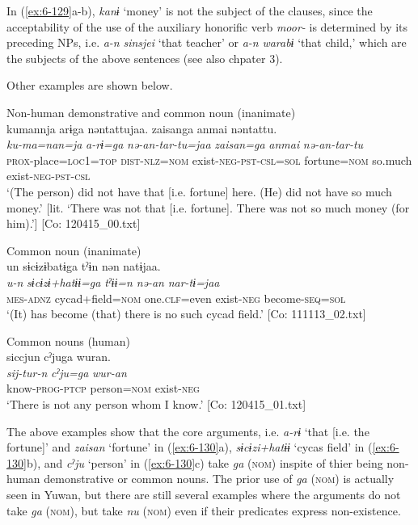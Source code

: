 \begin{styleBeschriftung}
In (\ref{ex:6-129}a-b), \textit{kanɨ} ‘money’ is not the subject of the clauses, since the acceptability of the use of the auxiliary honorific verb \textit{moor-} is determined by its preceding NPs, i.e. \textit{a-n} \textit{sinsjei} ‘that teacher’ or \textit{a-n} \textit{warabɨ} ‘that child,’ which are the subjects of the above sentences (see also chpater 3).

Other examples are shown below.

\ea\label{ex:6-130}
 Non-human demonstrative and common noun (inanimate)\\
 \ea
 {\TM}
 \glll kumannja  arɨga  nəntattujaa.    {\textbar}zaisan{\textbar}ga  anmai  nəntattu.\\
 \textit{ku-ma=nan=ja}  \textit{a-rɨ=ga}  \textit{nə-an-tar-tu=jaa}     \textit{zaisan=ga}  \textit{anmai}  \textit{nə-an-tar-tu}\\
\textsc{prox}-place=\textsc{loc1}=\textsc{top}  \textsc{dist}-\textsc{nlz}=\textsc{nom}  exist-\textsc{neg}-\textsc{pst}-\textsc{csl}=\textsc{sol}   fortune=\textsc{nom}  so.much  exist-\textsc{neg}-\textsc{pst}-\textsc{csl}\\
\glt ‘(The person) did not have that [i.e. fortune] here. (He) did not have so much money.’ [lit. ‘There was not that [i.e. fortune]. There was not so much money (for him).’]       [Co: 120415\_00.txt]
\z

Common noun (inanimate)\\

\ex {\TM}  un  sɨcɨzɨbatɨga  tˀɨn  nən  natɨjaa.\\
\glll \textit{u-n}  \textit{sɨcɨzɨ+hatɨɨ=ga}  \textit{tˀɨɨ=n}  \textit{nə-an}     \textit{nar-tɨ=jaa}\\
\textsc{mes}-\textsc{adnz}  cycad+field=\textsc{nom}  one.\textsc{clf}=even  exist-\textsc{neg}  become-\textsc{seq}=\textsc{sol}\\
\glt ‘(It) has become (that) there is no such cycad field.’ [Co: 111113\_02.txt]
\z

Common nouns (human)\\

\ex {\TM}  siccjun  cˀjuga  wuran.\\
\glll \textit{sij-tur-n}  \textit{cˀju=ga}  \textit{wur-an}\\
know-\textsc{prog}-\textsc{ptcp}  person=\textsc{nom}  exist-\textsc{neg}\\
\glt ‘There is not any person whom I know.’ [Co: 120415\_01.txt]
\z

The above examples show that the core arguments, i.e. \textit{a-rɨ} ‘that [i.e. the fortune]’ and \textit{zaisan} ‘fortune’ in (\ref{ex:6-130}a), \textit{sɨcɨzi+hatɨɨ} ‘cycas field’ in (\ref{ex:6-130}b), and \textit{cˀju} ‘person’ in (\ref{ex:6-130}c) take \textit{ga} (\textsc{nom}) inspite of thier being non-human demonstrative or common nouns. The prior use of \textit{ga} (\textsc{nom}) is actually seen in Yuwan, but there are still several examples where the arguments do not take \textit{ga} (\textsc{nom}), but take \textit{nu} (\textsc{nom}) even if their predicates express non-existence.


\end{styleBeschriftung}
